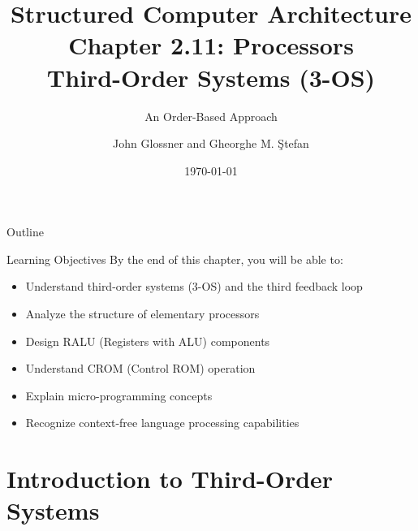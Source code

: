 \documentclass[aspectratio=169,11pt]{beamer}
\title[Chapter 2.11: Processors]{Structured Computer Architecture\\Chapter 2.11: Processors\\Third-Order Systems (3-OS)}
\subtitle{An Order-Based Approach}
\author{John Glossner and Gheorghe M. Ştefan}
\institute{Based on the textbook}
\date{\today}
\begin{document}
\begin{frame}
\titlepage
\end{frame}

\begin{frame}{Outline}
\tableofcontents
\end{frame}

\begin{frame}{Learning Objectives}
By the end of this chapter, you will be able to:
\begin{itemize}
\item Understand third-order systems (3-OS) and the third feedback loop
\item Analyze the structure of elementary processors
\item Design RALU (Registers with ALU) components
\item Understand CROM (Control ROM) operation
\item Explain micro-programming concepts
\item Recognize context-free language processing capabilities
\end{itemize}
\end{frame}

\section{Introduction to Third-Order Systems}
\end{document}
